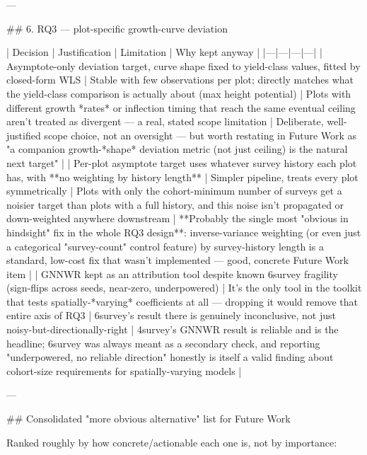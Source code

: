 ---

## 6. RQ3 — plot-specific growth-curve deviation

| Decision | Justification | Limitation | Why kept anyway |
|---|---|---|---|
| Asymptote-only deviation target, curve shape fixed to yield-class values, fitted by closed-form WLS | Stable with few observations per plot; directly matches what the yield-class comparison is actually about (max height potential) | Plots with different growth *rates* or inflection timing that reach the same eventual ceiling aren't treated as divergent — a real, stated scope limitation | Deliberate, well-justified scope choice, not an oversight — but worth restating in Future Work as "a companion growth-*shape* deviation metric (not just ceiling) is the natural next target" |
| Per-plot asymptote target uses whatever survey history each plot has, with **no weighting by history length** | Simpler pipeline, treats every plot symmetrically | Plots with only the cohort-minimum number of surveys get a noisier target than plots with a full history, and this noise isn't propagated or down-weighted anywhere downstream | **Probably the single most "obvious in hindsight" fix in the whole RQ3 design**: inverse-variance weighting (or even just a categorical "survey-count" control feature) by survey-history length is a standard, low-cost fix that wasn't implemented — good, concrete Future Work item |
| GNNWR kept as an attribution tool despite known 6survey fragility (sign-flips across seeds, near-zero, underpowered) | It's the only tool in the toolkit that tests spatially-*varying* coefficients at all — dropping it would remove that entire axis of RQ3 | 6survey's result there is genuinely inconclusive, not just noisy-but-directionally-right | 4survey's GNNWR result is reliable and is the headline; 6survey was always meant as a secondary check, and reporting "underpowered, no reliable direction" honestly is itself a valid finding about cohort-size requirements for spatially-varying models |

---

## Consolidated "more obvious alternative" list for Future Work

Ranked roughly by how concrete/actionable each one is, not by importance:

